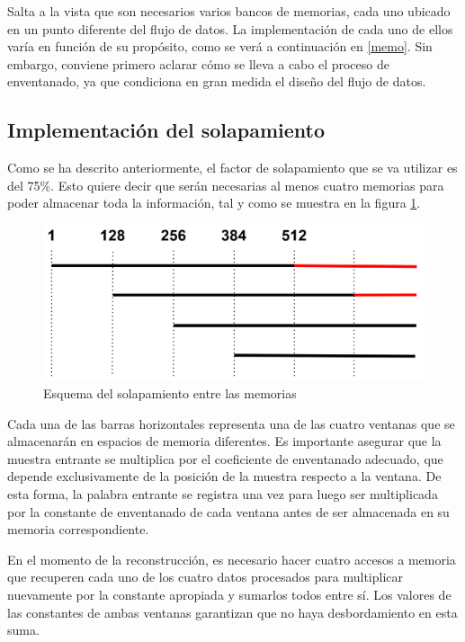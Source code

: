 Salta a la vista que son necesarios varios bancos de memorias, cada uno ubicado en un punto diferente del flujo de datos. La implementación de cada uno de ellos varía en función de su propósito, como se verá a continuación en \ref{memo}. Sin embargo, conviene primero aclarar cómo se lleva a cabo el proceso de enventanado, ya que condiciona en gran medida el diseño del flujo de datos.

\subsection{Implementación del solapamiento}
Como se ha descrito anteriormente, el factor de solapamiento que se va utilizar es del 75\%. Esto quiere decir que serán necesarias al menos cuatro memorias para poder almacenar toda la información, tal y como se muestra en la figura \ref{fig:solap}. 

\begin{figure}[!b]
\begin{center}
\includegraphics[width=13cm]{img/solap.png}
\caption{\label{fig:solap}Esquema del solapamiento entre las memorias}
\end{center}
\end{figure}

Cada una de las barras horizontales representa una de las cuatro ventanas que se almacenarán en espacios de memoria diferentes. Es importante asegurar que la muestra entrante se multiplica por el coeficiente de enventanado adecuado, que depende exclusivamente de la posición de la muestra respecto a la ventana. De esta forma, la palabra entrante se registra una vez para luego ser multiplicada por la constante de enventanado de cada ventana antes de ser almacenada en su memoria correspondiente.

En el momento de la reconstrucción, es necesario hacer cuatro accesos a memoria que recuperen cada uno de los cuatro datos procesados para multiplicar nuevamente por la constante apropiada y sumarlos todos entre sí. Los valores de las constantes de ambas ventanas garantizan que no haya desbordamiento en esta suma.

